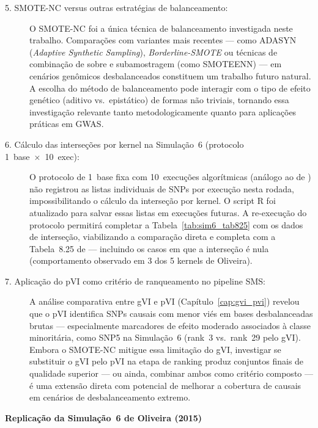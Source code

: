 \documentclass[
    12pt,
    a4paper,
    oneside,
    english,
    french,
    spanish,
    brazil
    ]{abntex2}
\newcommand{\novo}[1]{\textcolor{corNova}{#1}}
\begin{document}
\begin{description}
  \item[\novo{5. SMOTE-NC versus outras estratégias de balanceamento:}]
  \novo{O SMOTE-NC foi a única técnica de balanceamento investigada neste trabalho. Comparações com variantes mais recentes --- como ADASYN (\textit{Adaptive Synthetic Sampling}), \textit{Borderline-SMOTE} ou técnicas de combinação de sobre e subamostragem (como SMOTEENN) --- em cenários genômicos desbalanceados constituem um trabalho futuro natural. A escolha do método de balanceamento pode interagir com o tipo de efeito genético (aditivo vs.\ epistático) de formas não triviais, tornando essa investigação relevante tanto metodologicamente quanto para aplicações práticas em GWAS.}

  \item[\novo{6. Cálculo das interseções por kernel na Simulação~6 (protocolo 1~base~×~10~exec):}]
  \novo{O protocolo de 1~base fixa com 10~execuções algorítmicas (análogo ao de \citeonline{Oliveira2015}) não registrou as listas individuais de SNPs por execução nesta rodada, impossibilitando o cálculo da interseção por kernel. O script R foi atualizado para salvar essas listas em execuções futuras. A re-execução do protocolo permitirá completar a Tabela~\ref{tab:sim6_tab825} com os dados de interseção, viabilizando a comparação direta e completa com a Tabela~8.25 de \citeonline{Oliveira2015} --- incluindo os casos em que a interseção é nula (comportamento observado em 3 dos 5 kernels de Oliveira).}

  \item[\novo{7. Aplicação do pVI como critério de ranqueamento no pipeline SMS:}]
  \novo{A análise comparativa entre gVI e pVI (Capítulo~\ref{cap:gvi_pvi}) revelou que o pVI identifica SNPs causais com menor viés em bases desbalanceadas brutas --- especialmente marcadores de efeito moderado associados à classe minoritária, como SNP5 na Simulação~6 (rank~3 vs.\ rank~29 pelo gVI). Embora o SMOTE-NC mitigue essa limitação do gVI, investigar se substituir o gVI pelo pVI na etapa de ranking produz conjuntos finais de qualidade superior --- ou ainda, combinar ambos como critério composto --- é uma extensão direta com potencial de melhorar a cobertura de causais em cenários de desbalanceamento extremo.}

\end{description}

\bigskip
\bigskip
\noindent\textbf{Replicação da Simulação~6 de Oliveira (2015)}
\end{document}
